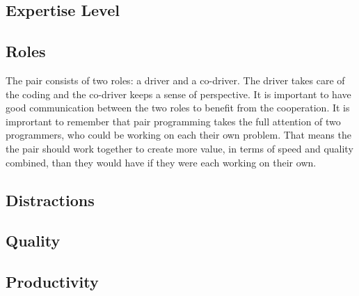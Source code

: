 \subsection{Expertise Level}



\subsection{Roles}
The pair consists of two roles: a driver and a co-driver.
The driver takes care of the coding and the co-driver keeps a sense of perspective.
It is important to have good communication between the two roles to benefit from the cooperation.
It is imprortant to remember that pair programming takes the full attention of two programmers, who could be working on each their own problem.
That means the the pair should work together to create more value, in terms of speed and quality combined, than they would have if they were each working on their own.


\subsection{Distractions}



\subsection{Quality}



\subsection{Productivity}






